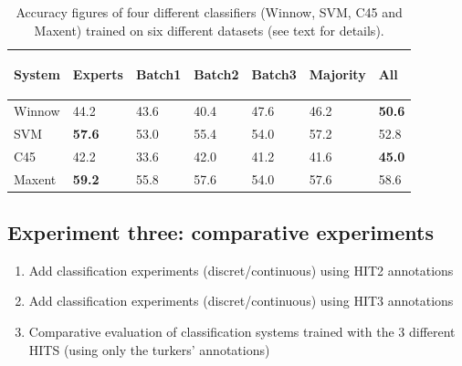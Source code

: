 \documentclass[11pt, a4paper,onecolumn]{article}
\begin{document}
\begin{table}
\begin{center}
\begin{small}
\begin{tabular}{|l|l|l|l|l|l|l|} \hline
 System & 
 {\begin{sideways}\parbox{2cm}{\centering Experts}\end{sideways}} &
 {\begin{sideways}\parbox{2cm}{\centering Batch1}\end{sideways}} &
 {\begin{sideways}\parbox{2cm}{\centering Batch2}\end{sideways}} &
 {\begin{sideways}\parbox{2cm}{\centering Batch3}\end{sideways}} &
 {\begin{sideways}\parbox{2cm}{\centering Majority}\end{sideways}} &
 {\begin{sideways}\parbox{2cm}{\centering All}\end{sideways}} \\ \hline
 Winnow & 44.2 & 43.6 & 40.4 & 47.6 & 46.2 & \textbf{50.6} \\ \hline
 SVM & \textbf{57.6} & 53.0 & 55.4 & 54.0 & 57.2 & 52.8 \\ \hline
 C45 & 42.2 & 33.6 & 42.0 & 41.2 & 41.6 & \textbf{45.0} \\ \hline
 Maxent & \textbf{59.2} & 55.8 & 57.6 & 54.0 & 57.6 & 58.6 \\ \hline
\end{tabular}
\end{small}
\end{center}
\caption{Accuracy figures of four different classifiers (Winnow, SVM, C45 and Maxent) trained on six different datasets (see text for details).}
\label{table:amtvsexp}
\end{table}





\subsection{Experiment three: comparative experiments}

\begin{enumerate}
\item Add classification experiments (discret/continuous) using HIT2 annotations
\item Add classification experiments (discret/continuous) using HIT3 annotations

\item Comparative evaluation of classification systems trained with the 3 different HITS (using only the turkers' annotations)
\end{enumerate}
\end{document}
